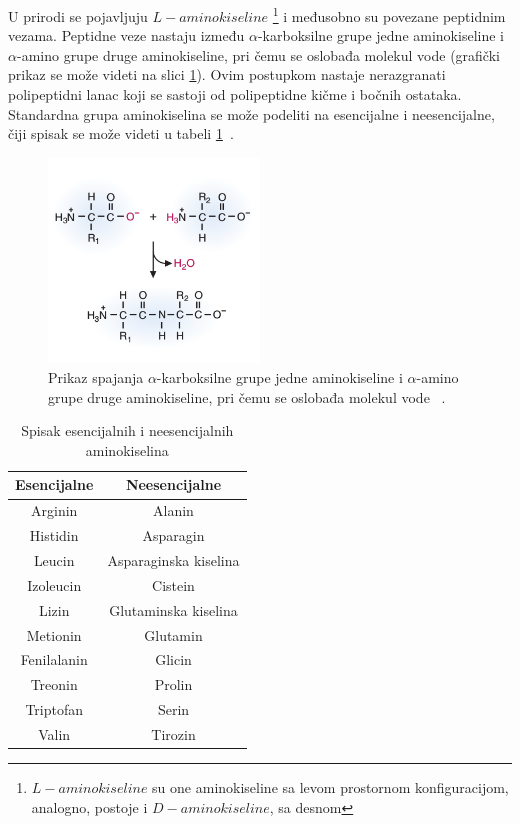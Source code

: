 U prirodi se pojavljuju $L-aminokiseline$ \footnote{$L-aminokiseline$ su one aminokiseline sa levom prostornom konfiguracijom, analogno, postoje i $D-aminokiseline$, sa desnom} i međusobno su povezane peptidnim vezama. Peptidne veze nastaju između $\alpha$-karboksilne grupe jedne aminokiseline i $\alpha$-amino grupe druge aminokiseline, pri čemu se oslobađa molekul vode (grafički prikaz se može videti na slici \ref{fig:peptidebonds}). Ovim postupkom nastaje nerazgranati polipeptidni lanac koji se sastoji od polipeptidne kičme i bočnih ostataka. Standardna grupa aminokiselina se može podeliti na esencijalne i
neesencijalne, čiji spisak se može videti u tabeli \ref{table:1}~\cite{MarijaJ,biopathways}.\\ 

\begin{figure}[h]
	\centering
    \includegraphics[width=0.5\textwidth]{Figures/BO/peptide_bonds.png}
    \caption{Prikaz spajanja $\alpha$-karboksilne grupe jedne aminokiseline i $\alpha$-amino grupe druge aminokiseline, pri čemu se oslobađa molekul vode ~\cite{bmbg}.}
    \label{fig:peptidebonds}
\end{figure}

\begin{table}[h!]
\centering
	\begin{tabular}{||c c||} 
	\hline 
	Esencijalne & Neesencijalne \\ [0.5ex] 
	\hline\hline
	Arginin & Alanin \\ 
	\hline
	Histidin & Asparagin \\
	\hline
	Leucin & Asparaginska kiselina\\
	\hline
	Izoleucin & Cistein \\
	\hline
	Lizin & Glutaminska kiselina \\ [1ex] 
	\hline
	Metionin & Glutamin \\ [1ex] 
	\hline
	Fenilalanin & Glicin \\ [1ex] 
	\hline
	Treonin & Prolin \\ [1ex] 
	\hline
	Triptofan & Serin \\ [1ex] 
	\hline
	Valin & Tirozin \\ [1ex] 
	\hline
	\end{tabular}
\caption{Spisak esencijalnih i neesencijalnih aminokiselina}
\label{table:1}
\end{table}

